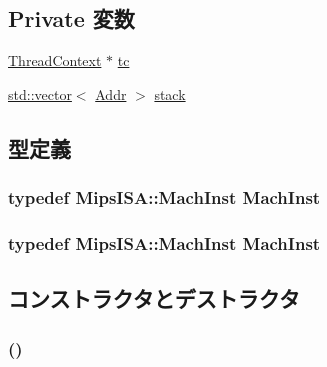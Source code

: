 \subsection*{Private 変数}
\begin{DoxyCompactItemize}
\item 
\hyperlink{classThreadContext}{ThreadContext} $\ast$ \hyperlink{classMipsISA_1_1StackTrace_a7d1b4bb6199b71a875f0eb5d9c19022b}{tc}
\item 
\hyperlink{classstd_1_1vector}{std::vector}$<$ \hyperlink{classm5_1_1params_1_1Addr}{Addr} $>$ \hyperlink{classMipsISA_1_1StackTrace_adcb91530de92b76721b370071350200d}{stack}
\end{DoxyCompactItemize}


\subsection{型定義}
\hypertarget{classMipsISA_1_1StackTrace_a3f35b9076070a26d3e479196d6234916}{
\subsubsection[{MachInst}]{\setlength{\rightskip}{0pt plus 5cm}typedef {\bf MipsISA::MachInst} {\bf MachInst}}}
\label{classMipsISA_1_1StackTrace_a3f35b9076070a26d3e479196d6234916}
\hypertarget{classMipsISA_1_1StackTrace_a3f35b9076070a26d3e479196d6234916}{
\subsubsection[{MachInst}]{\setlength{\rightskip}{0pt plus 5cm}typedef {\bf MipsISA::MachInst} {\bf MachInst}}}
\label{classMipsISA_1_1StackTrace_a3f35b9076070a26d3e479196d6234916}


\subsection{コンストラクタとデストラクタ}
\hypertarget{classMipsISA_1_1StackTrace_a5a9b2e3bba2262e73b20f87325efd063}{
\subsubsection[{StackTrace}]{ ()}}
\label{classMipsISA_1_1StackTrace_a5a9b2e3bba2262e73b20f87325efd063}



